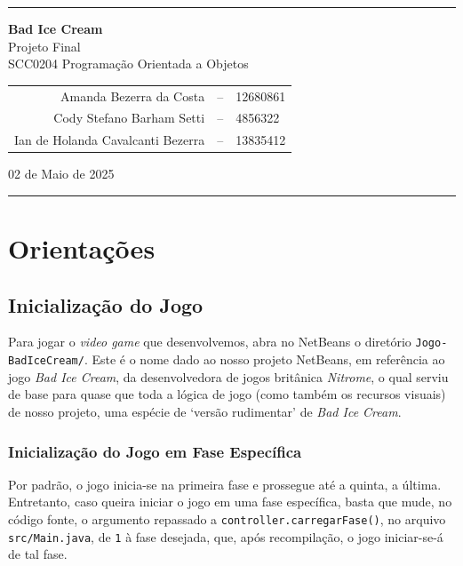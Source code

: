 \documentclass[10pt,a4paper,portuguese]{article}
\begin{document}
    \vspace{5mm}
    \rule{0.95\textwidth}{1pt}
    \vspace{3mm}
    \begin{center}
        \textbf{\huge Bad Ice Cream} \\
        \Large Projeto Final \\
        \large SCC0204 Programação Orientada a Objetos
    
        \vspace{8mm}
        \begin{tabular}{rcl}
            Amanda Bezerra da Costa &-- &12680861 \\
            Cody Stefano Barham Setti &-- &4856322 \\
            Ian de Holanda Cavalcanti Bezerra &-- &13835412
        \end{tabular}

    \vspace{8mm}
    02 de Maio de 2025
    \end{center}

    \vspace{1mm}
    \rule{0.95\textwidth}{1pt}
    \vspace{0.5cm}

    \section{Orientações}
    \subsection{Inicialização do Jogo}
        Para jogar o \emph{video game} que desenvolvemos, abra no NetBeans o diretório \verb|Jogo-BadIceCream/|. Este é o nome dado ao nosso projeto NetBeans, em referência ao jogo \emph{Bad Ice Cream}, da desenvolvedora de jogos britânica \emph{Nitrome}, o qual serviu de base para quase que toda a lógica de jogo (como também os recursos visuais) de nosso projeto, uma espécie de `versão rudimentar' de \emph{Bad Ice Cream}.

    \subsubsection{Inicialização do Jogo em Fase Específica}
        Por padrão, o jogo inicia-se na primeira fase e prossegue até a quinta, a última. Entretanto, caso queira iniciar o jogo em uma fase específica, basta que mude, no código fonte, o argumento repassado a \verb|controller.carregarFase()|, no arquivo \verb|src/Main.java|, de \verb|1| à fase desejada, que, após recompilação, o jogo iniciar-se-á de tal fase.
        
\end{document}
